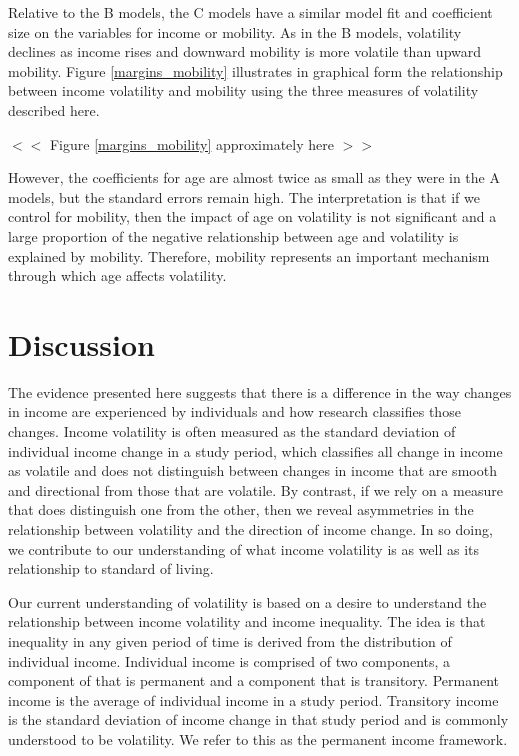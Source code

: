 \documentclass[12pt]{article}
\begin{document}
Relative to the B models, the C models have a similar model fit and coefficient size on the variables for income or mobility. As in the B models, volatility declines as income rises and downward mobility is more volatile than upward mobility.  Figure \ref{margins_mobility} illustrates in graphical form the relationship between income volatility and mobility using the three measures of volatility described here. 
\begin{center}
$<<$ Figure \ref{margins_mobility} approximately here $>>$ 
\end{center}
However, the coefficients for age are almost twice as small as they were in the A models, but the standard errors remain high. The interpretation is that if we control for mobility, then the impact of age on volatility is not significant and a large proportion of the negative relationship between age and volatility is explained by mobility.  Therefore, mobility represents an important mechanism through which age affects volatility. 

\section{Discussion}

The evidence presented here suggests that there is a difference in the way changes in income are experienced by individuals and how research classifies those changes. Income volatility is often measured as the standard deviation of individual income change in a study period, which classifies all change in income as volatile and does not distinguish between changes in income that are smooth and directional from those that are volatile. By contrast, if we rely on a measure that does distinguish one from the other, then we reveal asymmetries in the relationship between volatility and the direction of income change. In so doing, we contribute to our understanding of what income volatility is as well as its relationship to standard of living.

Our current understanding of volatility is based on a desire to understand the relationship between income volatility and income inequality. The idea is that inequality in any given period of time is derived from the distribution of individual income. Individual income is comprised of two components, a component of that is permanent and a component that is transitory. Permanent income is the average of individual income in a study period. Transitory income is the standard deviation of income change in that study period and is commonly understood to be volatility. We refer to this as the permanent income framework.
\end{document}
